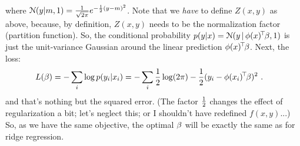 \begin{solution}
\begin{align}
	\end{align}
	where ${\cal N}(y|m,1) = \frac{1}{\sqrt{2\pi}} e^{-\frac{1}{2}(y-m)^2}$. Note
	that we \emph{have} to define $Z(x,y)$ as above, because, by
	definition, $Z(x,y)$ needs to be the normalization factor (partition
	function). So, the conditional probability $p(y | x) = {\cal N}(y
	\,|\, \phi(x)^{\!\top\!} \beta, 1)$ is just the unit-variance Gaussian around the
	linear prediction $\phi(x)^{\!\top\!} \beta$. Next, the loss:
	\begin{align}
		L(\beta)
		&= - \sum_i \log p(y_i | x_i)
		= - \sum_i \frac{1}{2} \log(2\pi) - \frac{1}{2} (y_i - \phi(x_i)^{\!\top\!} \beta)^2 ~.
	\end{align}
	and that's nothing but the squared error. (The factor $\frac{1}{2}$ changes
	the effect of regularization a bit; let's neglect this; or I shouldn't
	have redefined $f(x,y)$...) So, as we have the same objective, the
	optimal $\beta$ will be exactly the same as for ridge regression.
\end{solution}
\fi


\exerfoot
